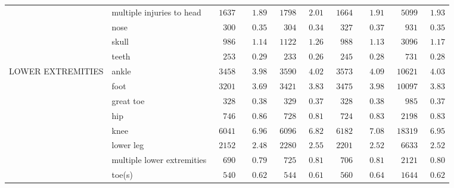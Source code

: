 \documentclass[9pt, oneside]{article}   	%
\begin{document}
\begin{longtable}{p{1.8in}p{2.2in}cccccccc}
 & multiple injuries to head  & $\phantom{0}1637$ & $\phantom{00}1.89$ & $\phantom{0}1798$ & $\phantom{0}2.01$ & $\phantom{0}1664$ & $\phantom{00}1.91$ & $\phantom{00}5099$ & $\phantom{0}1.93$ \\
 & nose  & $\phantom{00}300$ & $\phantom{00}0.35$ & $\phantom{00}304$ & $\phantom{0}0.34$ & $\phantom{00}327$ & $\phantom{00}0.37$ & $\phantom{000}931$ & $\phantom{0}0.35$ \\
 & skull  & $\phantom{00}986$ & $\phantom{00}1.14$ & $\phantom{0}1122$ & $\phantom{0}1.26$ & $\phantom{00}988$ & $\phantom{00}1.13$ & $\phantom{00}3096$ & $\phantom{0}1.17$ \\
 & teeth  & $\phantom{00}253$ & $\phantom{00}0.29$ & $\phantom{00}233$ & $\phantom{0}0.26$ & $\phantom{00}245$ & $\phantom{00}0.28$ & $\phantom{000}731$ & $\phantom{0}0.28$ \\
LOWER EXTREMITIES & ankle  & $\phantom{0}3458$ & $\phantom{00}3.98$ & $\phantom{0}3590$ & $\phantom{0}4.02$ & $\phantom{0}3573$ & $\phantom{00}4.09$ & $\phantom{0}10621$ & $\phantom{0}4.03$ \\
 & foot  & $\phantom{0}3201$ & $\phantom{00}3.69$ & $\phantom{0}3421$ & $\phantom{0}3.83$ & $\phantom{0}3475$ & $\phantom{00}3.98$ & $\phantom{0}10097$ & $\phantom{0}3.83$ \\
 & great toe  & $\phantom{00}328$ & $\phantom{00}0.38$ & $\phantom{00}329$ & $\phantom{0}0.37$ & $\phantom{00}328$ & $\phantom{00}0.38$ & $\phantom{000}985$ & $\phantom{0}0.37$ \\
 & hip  & $\phantom{00}746$ & $\phantom{00}0.86$ & $\phantom{00}728$ & $\phantom{0}0.81$ & $\phantom{00}724$ & $\phantom{00}0.83$ & $\phantom{00}2198$ & $\phantom{0}0.83$ \\
 & knee  & $\phantom{0}6041$ & $\phantom{00}6.96$ & $\phantom{0}6096$ & $\phantom{0}6.82$ & $\phantom{0}6182$ & $\phantom{00}7.08$ & $\phantom{0}18319$ & $\phantom{0}6.95$ \\
 & lower leg  & $\phantom{0}2152$ & $\phantom{00}2.48$ & $\phantom{0}2280$ & $\phantom{0}2.55$ & $\phantom{0}2201$ & $\phantom{00}2.52$ & $\phantom{00}6633$ & $\phantom{0}2.52$ \\
 & multiple lower extremities  & $\phantom{00}690$ & $\phantom{00}0.79$ & $\phantom{00}725$ & $\phantom{0}0.81$ & $\phantom{00}706$ & $\phantom{00}0.81$ & $\phantom{00}2121$ & $\phantom{0}0.80$ \\
 & toe(s)  & $\phantom{00}540$ & $\phantom{00}0.62$ & $\phantom{00}544$ & $\phantom{0}0.61$ & $\phantom{00}560$ & $\phantom{00}0.64$ & $\phantom{00}1644$ & $\phantom{0}0.62$ \\

\end{longtable}
\end{document}

